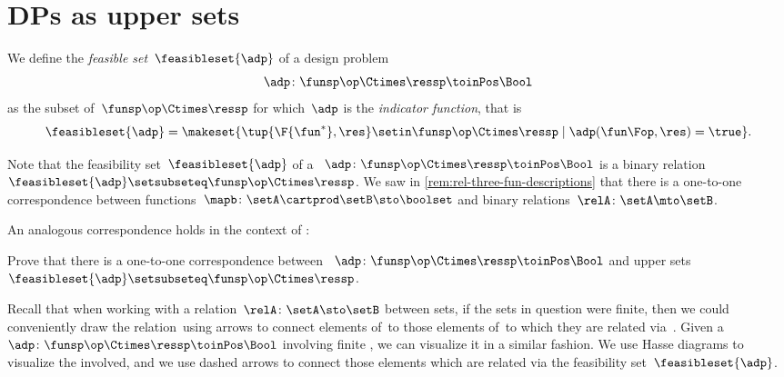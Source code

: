 \section{DPs as upper sets}

\begin{definition}
    \label{def:dp-feasible-set}
    We define the \emph{feasible set}~$\feasibleset{\adp}$ of a design problem
    \begin{equation}
        \label{eq:generic-design-prob}
        \adp\colon \funsp\op \Ctimes \ressp \toinPos \Bool
    \end{equation}
    as the subset of~$\funsp \op\Ctimes \ressp$ for which~$\adp$ is the \emph{indicator function}, that is%
    \begin{equation}
        \label{eq:design-prob-as-upper-set}
        \feasibleset{\adp} = \makeset{ \tup{\F{\fun^*},\res} \setin \funsp \op\Ctimes \ressp  \mid %
            \adp(\fun\Fop, \res) = \true %
        }.
    \end{equation}
\end{definition}

Note that the feasibility set~$\feasibleset{\adp}$ of a ~$\adp \colon \funsp \op \Ctimes \ressp\toinPos \Bool$ is a binary relation~$\feasibleset{\adp} \setsubseteq \funsp\op \Ctimes \ressp$.
We saw in \cref{rem:rel-three-fun-descriptions} that there is a one-to-one correspondence between functions~$\mapb \colon \setA \cartprod \setB \sto \boolset$ and binary relations~$\relA\colon \setA \mto \setB$.

An analogous correspondence holds in the context of  :

\begin{exercise}
    \label{ex:adp-uppersets}
    Prove that there is a one-to-one correspondence between  ~$\adp \colon \funsp \op \Ctimes \ressp\toinPos \Bool$ and upper sets~$\feasibleset{\adp} \setsubseteq \funsp\op \Ctimes \ressp$.
\end{exercise}
\begin{solution}
    \missingsolution

\end{solution}

Recall that when working with a relation~$\relA \colon \setA \sto \setB$ between sets, if the sets in question were finite, then we could conveniently draw the relation~\relA using arrows to connect elements of~\setA to those elements of~\setB to which they are related via~\relA.
Given a ~$\adp \colon \funsp \op \Ctimes \ressp\toinPos \Bool$ involving finite , we can visualize it in a similar fashion.
We use Hasse diagrams to visualize the  involved, and we use dashed arrows to connect those elements which are related via the feasibility set~$\feasibleset{\adp}$.

